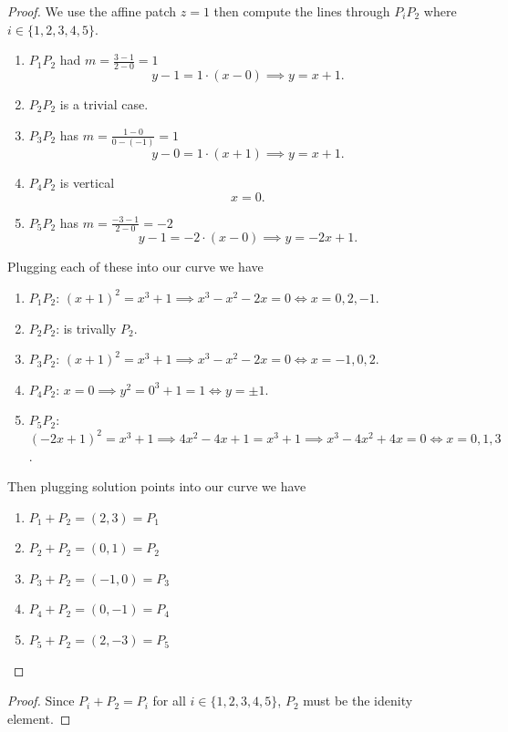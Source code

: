 \begin{proof}
    We use the affine patch $z = 1$ then compute the lines through $P_i P_2$ where $i \in \{1, 2, 3, 4, 5\}$.
    \begin{enumerate}
        \item $P_1 P_2$ had
        $m = \frac{3-1}{2-0} = 1$
        \[
            y - 1 = 1 \cdot (x - 0) \implies y = x + 1.
        \]
        \item $P_2 P_2$ is a trivial case.
        \item $P_3 P_2$ has
        $m = \frac{1-0}{0-(-1)} = 1$
        \[
            y - 0 = 1 \cdot (x + 1) \implies y = x + 1.
        \]
        \item $P_4 P_2$ is vertical
        \[
            x = 0.
        \]
        \item $P_5 P_2$ has
        $m = \frac{-3-1}{2-0} = -2$
        \[
            y - 1 = -2 \cdot (x - 0) \implies y = -2x + 1.
        \]
    \end{enumerate}
    Plugging each of these into our curve we have 
    \begin{enumerate}
        \item $P_1 P_2$: $(x+1)^2 = x^3 + 1 \implies x^3 - x^2 - 2x = 0 \iff x = 0, 2, -1$.
        \item $P_2 P_2$: is trivally $P_2$.
        \item $P_3 P_2$: $(x+1)^2 = x^3 + 1 \implies x^3 - x^2 - 2x = 0 \iff x = -1, 0, 2$.
        \item $P_4 P_2$: $x = 0 \implies y^2 = 0^3 + 1 = 1 \iff y = \pm 1$.
        \item $P_5 P_2$: $(-2x+1)^2 = x^3 + 1 \implies 4x^2 - 4x + 1 = x^3 + 1 \implies x^3 - 4x^2 + 4x = 0 \iff x = 0, 1, 3$.
    \end{enumerate}
    Then plugging solution points into our curve we have 
    \begin{enumerate}
        \item $P_1 + P_2 = (2,3) = P_1$
        \item $P_2 + P_2 = (0,1) = P_2$
        \item $P_3 + P_2 = (-1,0) = P_3$
        \item $P_4 + P_2 = (0,-1) = P_4$
        \item $P_5 + P_2 = (2,-3) = P_5$
    \end{enumerate}
\end{proof}

\begin{proof}
    Since $P_i + P_2 = P_i$ for all $i \in \{1, 2, 3, 4, 5\}$,
        $P_2$ must be the idenity element.
\end{proof}



